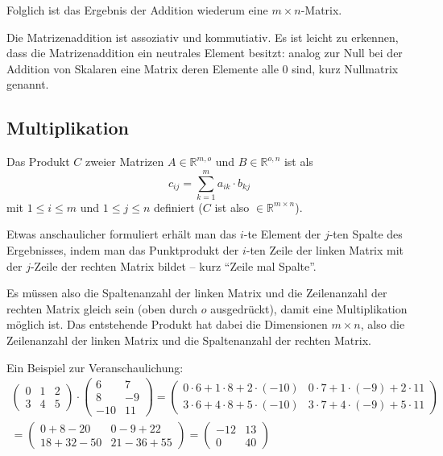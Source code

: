 Folglich ist das Ergebnis der Addition wiederum eine $m \times n$-Matrix.

Die Matrizenaddition ist assoziativ und kommutiativ. Es ist leicht zu erkennen, dass die Matrizenaddition ein neutrales Element besitzt: analog zur Null bei der Addition von Skalaren eine Matrix deren Elemente alle 0 sind, kurz Nullmatrix genannt.


\subsection{Multiplikation}
Das Produkt $C$ zweier Matrizen $A \in \mathbb{R}^{m,o}$ und $B \in \mathbb{R}^{o,n}$ ist als
\begin{equation}
 c_{ij} = \sum_{k=1}^m{a_{ik} \cdot b_{kj}}
\end{equation}
mit $1 \leq i \leq m$ und $1 \leq j \leq n$ definiert ($C$ ist also $\in \mathbb{R}^{m \times n}$).

Etwas anschaulicher formuliert erhält man das $i$-te Element der $j$-ten Spalte des Ergebnisses, indem man das Punktprodukt der $i$-ten Zeile der linken Matrix mit der $j$-Zeile der rechten Matrix bildet -- kurz \enquote{Zeile mal Spalte}.

Es müssen also die Spaltenanzahl der linken Matrix und die Zeilenanzahl der rechten Matrix gleich sein (oben durch $o$ ausgedrückt), damit eine Multiplikation möglich ist. Das entstehende Produkt hat dabei die Dimensionen $m \times n$, also die Zeilenanzahl der linken Matrix und die Spaltenanzahl der rechten Matrix.

Ein Beispiel zur Veranschaulichung:
\begin{equation}
\begin{split}
 \begin{pmatrix}
  0 & 1 & 2 \\
  3 & 4 & 5
 \end{pmatrix}
 \cdot
 \begin{pmatrix}
  6 & 7 \\
  8 & -9 \\
  -10 & 11
 \end{pmatrix}
 =
 \begin{pmatrix}
  0 \cdot 6 + 1 \cdot 8 + 2 \cdot (-10) & 0 \cdot 7 + 1 \cdot (-9) + 2 \cdot 11 \\
  3 \cdot 6 + 4 \cdot 8 + 5 \cdot (-10) & 3 \cdot 7 + 4 \cdot (-9) + 5 \cdot 11
 \end{pmatrix}\\
 =
 \begin{pmatrix}
  0 + 8 - 20 & 0 - 9 + 22 \\
  18 + 32 - 50 & 21 - 36 + 55
 \end{pmatrix}
 =
 \begin{pmatrix}
   -12 & 13 \\
   0 & 40
 \end{pmatrix}
\end{split}
\end{equation}

